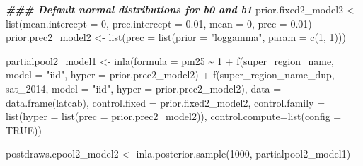 \documentclass[
]{article}
\newenvironment{Shaded}{\begin{snugshade}}{\end{snugshade}}
\newcommand{\AttributeTok}[1]{\textcolor[rgb]{0.77,0.63,0.00}{#1}}
\newcommand{\ConstantTok}[1]{\textcolor[rgb]{0.00,0.00,0.00}{#1}}
\newcommand{\DecValTok}[1]{\textcolor[rgb]{0.00,0.00,0.81}{#1}}
\newcommand{\DocumentationTok}[1]{\textcolor[rgb]{0.56,0.35,0.01}{\textbf{\textit{#1}}}}
\newcommand{\FloatTok}[1]{\textcolor[rgb]{0.00,0.00,0.81}{#1}}
\newcommand{\FunctionTok}[1]{\textcolor[rgb]{0.00,0.00,0.00}{#1}}
\newcommand{\NormalTok}[1]{#1}
\newcommand{\OtherTok}[1]{\textcolor[rgb]{0.56,0.35,0.01}{#1}}
\newcommand{\SpecialCharTok}[1]{\textcolor[rgb]{0.00,0.00,0.00}{#1}}
\newcommand{\StringTok}[1]{\textcolor[rgb]{0.31,0.60,0.02}{#1}}
\begin{document}
\begin{Shaded}
\begin{Highlighting}[]
\DocumentationTok{\#\#\# Default normal distributions for b0 and b1}
\NormalTok{prior.fixed2\_model2 }\OtherTok{\textless{}{-}} \FunctionTok{list}\NormalTok{(}\AttributeTok{mean.intercept =} \DecValTok{0}\NormalTok{, }\AttributeTok{prec.intercept =} \FloatTok{0.01}\NormalTok{,}
                    \AttributeTok{mean =} \DecValTok{0}\NormalTok{, }\AttributeTok{prec =} \FloatTok{0.01}\NormalTok{)}
\NormalTok{prior.prec2\_model2 }\OtherTok{\textless{}{-}} \FunctionTok{list}\NormalTok{(}\AttributeTok{prec =} \FunctionTok{list}\NormalTok{(}\AttributeTok{prior =} \StringTok{"loggamma"}\NormalTok{, }
                               \AttributeTok{param =} \FunctionTok{c}\NormalTok{(}\DecValTok{1}\NormalTok{, }\DecValTok{1}\NormalTok{)))}

\NormalTok{partialpool2\_model1 }\OtherTok{\textless{}{-}} \FunctionTok{inla}\NormalTok{(}\AttributeTok{formula =}\NormalTok{ pm25 }\SpecialCharTok{\textasciitilde{}} \DecValTok{1} \SpecialCharTok{+} 
                              \FunctionTok{f}\NormalTok{(super\_region\_name, }
                                \AttributeTok{model =} \StringTok{"iid"}\NormalTok{, }
                                \AttributeTok{hyper =}\NormalTok{ prior.prec2\_model2) }\SpecialCharTok{+} 
                              \FunctionTok{f}\NormalTok{(super\_region\_name\_dup, sat\_2014, }
                                \AttributeTok{model =} \StringTok{"iid"}\NormalTok{,}
                                \AttributeTok{hyper =}\NormalTok{ prior.prec2\_model2), }
                            \AttributeTok{data =} \FunctionTok{data.frame}\NormalTok{(latcab),}
                            \AttributeTok{control.fixed =}\NormalTok{ prior.fixed2\_model2,}
                            \AttributeTok{control.family =} \FunctionTok{list}\NormalTok{(}\AttributeTok{hyper =} \FunctionTok{list}\NormalTok{(}\AttributeTok{prec =}\NormalTok{ prior.prec2\_model2)),}
                            \AttributeTok{control.compute=}\FunctionTok{list}\NormalTok{(}\AttributeTok{config =} \ConstantTok{TRUE}\NormalTok{))}

\NormalTok{postdraws.cpool2\_model2 }\OtherTok{\textless{}{-}} \FunctionTok{inla.posterior.sample}\NormalTok{(}\DecValTok{1000}\NormalTok{, partialpool2\_model1)}


\end{Highlighting}
\end{Shaded}
\end{document}
